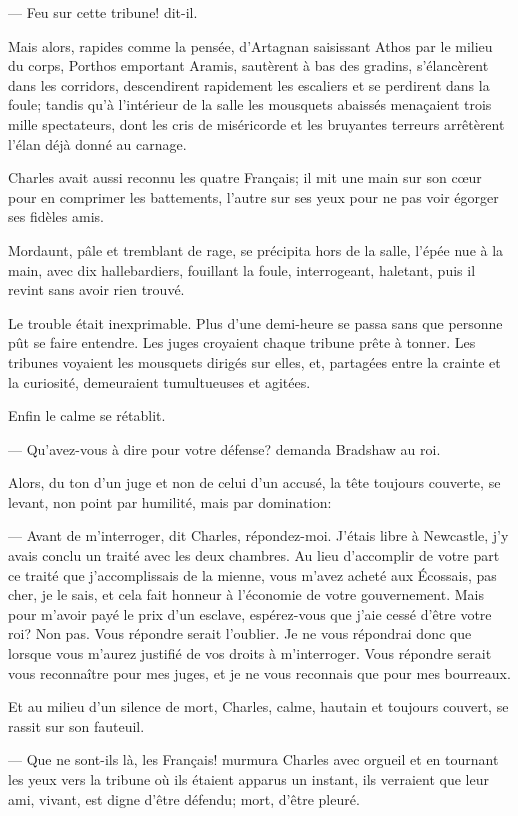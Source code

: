 — Feu sur cette tribune! dit-il.

Mais alors, rapides comme la pensée, d'Artagnan saisissant Athos par le milieu du corps, Porthos emportant Aramis, sautèrent à bas des gradins, s'élancèrent dans les corridors, descendirent rapidement les escaliers et se perdirent dans la foule; tandis qu'à l'intérieur de la salle les mousquets abaissés menaçaient trois mille spectateurs, dont les cris de miséricorde et les bruyantes terreurs arrêtèrent l'élan déjà donné au carnage.

Charles avait aussi reconnu les quatre Français; il mit une main sur son cœur pour en comprimer les battements, l'autre sur ses yeux pour ne pas voir égorger ses fidèles amis.

Mordaunt, pâle et tremblant de rage, se précipita hors de la salle, l'épée nue à la main, avec dix hallebardiers, fouillant la foule, interrogeant, haletant, puis il revint sans avoir rien trouvé.

Le trouble était inexprimable. Plus d'une demi-heure se passa sans que personne pût se faire entendre. Les juges croyaient chaque tribune prête à tonner. Les tribunes voyaient les mousquets dirigés sur elles, et, partagées entre la crainte et la curiosité, demeuraient tumultueuses et agitées.

Enfin le calme se rétablit.

— Qu'avez-vous à dire pour votre défense? demanda Bradshaw au roi.

Alors, du ton d'un juge et non de celui d'un accusé, la tête toujours couverte, se levant, non point par humilité, mais par domination:

— Avant de m'interroger, dit Charles, répondez-moi. J'étais libre à Newcastle, j'y avais conclu un traité avec les deux chambres. Au lieu d'accomplir de votre part ce traité que j'accomplissais de la mienne, vous m'avez acheté aux Écossais, pas cher, je le sais, et cela fait honneur à l'économie de votre gouvernement. Mais pour m'avoir payé le prix d'un esclave, espérez-vous que j'aie cessé d'être votre roi? Non pas. Vous répondre serait l'oublier. Je ne vous répondrai donc que lorsque vous m'aurez justifié de vos droits à m'interroger. Vous répondre serait vous reconnaître pour mes juges, et je ne vous reconnais que pour mes bourreaux.

Et au milieu d'un silence de mort, Charles, calme, hautain et toujours couvert, se rassit sur son fauteuil.

— Que ne sont-ils là, les Français! murmura Charles avec orgueil et en tournant les yeux vers la tribune où ils étaient apparus un instant, ils verraient que leur ami, vivant, est digne d'être défendu; mort, d'être pleuré.

